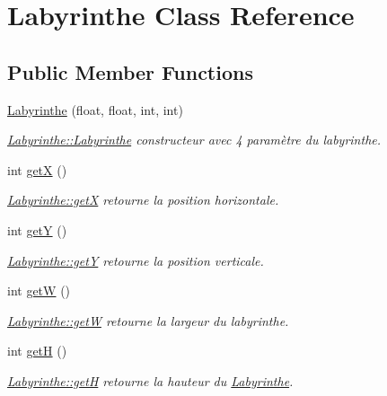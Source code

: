 \hypertarget{class_labyrinthe}{}\section{Labyrinthe Class Reference}
\label{class_labyrinthe}
\subsection*{Public Member Functions}
\begin{DoxyCompactItemize}
\item 
\hyperlink{class_labyrinthe_a5ee4a2803de1dca1116c7e6c8f08b5d0}{Labyrinthe} (float, float, int, int)
\begin{DoxyCompactList}\small\item\em \hyperlink{class_labyrinthe_a5ee4a2803de1dca1116c7e6c8f08b5d0}{Labyrinthe\+::\+Labyrinthe} constructeur avec 4 paramètre du labyrinthe. \end{DoxyCompactList}\item 
int \hyperlink{class_labyrinthe_aade17610e33994e5e021684915529db4}{get\+X} ()
\begin{DoxyCompactList}\small\item\em \hyperlink{class_labyrinthe_aade17610e33994e5e021684915529db4}{Labyrinthe\+::get\+X} retourne la position horizontale. \end{DoxyCompactList}\item 
int \hyperlink{class_labyrinthe_af78626c211db2bdb5b63ad6970051d4f}{get\+Y} ()
\begin{DoxyCompactList}\small\item\em \hyperlink{class_labyrinthe_af78626c211db2bdb5b63ad6970051d4f}{Labyrinthe\+::get\+Y} retourne la position verticale. \end{DoxyCompactList}\item 
int \hyperlink{class_labyrinthe_aed395b955cf23b81fabbf8b9d6011a45}{get\+W} ()
\begin{DoxyCompactList}\small\item\em \hyperlink{class_labyrinthe_aed395b955cf23b81fabbf8b9d6011a45}{Labyrinthe\+::get\+W} retourne la largeur du labyrinthe. \end{DoxyCompactList}\item 
int \hyperlink{class_labyrinthe_ab096d2a67a0b6d589a63f96929db0e40}{get\+H} ()
\begin{DoxyCompactList}\small\item\em \hyperlink{class_labyrinthe_ab096d2a67a0b6d589a63f96929db0e40}{Labyrinthe\+::get\+H} retourne la hauteur du \hyperlink{class_labyrinthe}{Labyrinthe}. \end{DoxyCompactList}\item 

\end{DoxyCompactItemize}
